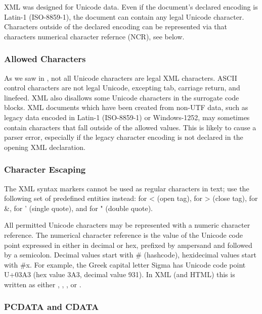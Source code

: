 XML was designed for Unicode data.
Even if the document's declared encoding is Latin-1 (ISO-8859-1),
the document can contain any legal Unicode character.
Characters outside of the declared encoding can be represented 
via that characters numerical character refernce (NCR), see below.

\subsubsection{Allowed Characters}

As we saw in , not all Unicode characters are legal XML characters.
ASCII control characters are not legal Unicode, excepting tab, carriage return, and linefeed.
XML also disallows some Unicode characters in the surrogate code blocks.
XML documents which have been created from non-UTF data, such as legacy data
encoded in Latin-1 (ISO-8859-1) or Windows-1252, 
may sometimes contain characters that fall outside of the allowed values.
This is likely to cause a parser error, especially if the legacy character encoding
is not declared in the opening XML declaration.


\subsubsection{Character Escaping}\label{section:xml-escape-codes}

The XML syntax markers cannot be used as regular characters in text; 
use the following set of predefined entities instead:
 for < (open tag),  for > (close tag),  for \&,
 for ' (single quote), and  for " (double quote).

All permitted Unicode characters may be represented with a numeric character reference.
The numerical character reference is the value of the Unicode code point
expressed in either in decimal or hex, 
prefixed by ampersand and followed by a semicolon.
Decimal values start with \# (hashcode), hexidecimal values start with \#x.
For example, the Greek capital letter Sigma has Unicode code point U+03A3
(hex value 3A3, decimal value 931).  In XML (and HTML) this is written as either
, , ,  or .

\subsubsection{PCDATA and CDATA}

